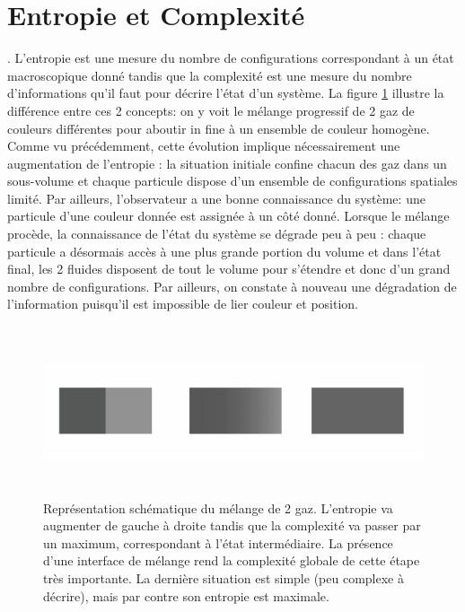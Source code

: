 \section{Entropie et Complexité}
. L'entropie est une mesure du nombre de configurations correspondant à un état macroscopique donné tandis que la complexité est une mesure du nombre d'informations qu'il faut pour décrire l'état d'un système. La figure \ref{f:melange} illustre la différence entre ces 2 concepts: on y voit le mélange progressif de 2 gaz de couleurs différentes pour aboutir in fine à un ensemble de couleur homogène. Comme vu précédemment, cette évolution implique nécessairement une augmentation de l'entropie : la situation initiale confine chacun des gaz dans un sous-volume et chaque particule dispose d'un ensemble de configurations spatiales limité. Par ailleurs, l'observateur a une bonne connaissance du système: une particule d'une couleur donnée est assignée à un côté donné. Lorsque le mélange procède, la connaissance de l'état du système se dégrade peu à peu : chaque particule a désormais accès à une plus grande portion du volume et dans l'état final, les 2 fluides disposent de tout le volume pour s'étendre et donc d'un grand nombre de configurations. Par ailleurs, on constate à nouveau une dégradation de l'information puisqu'il est impossible de lier couleur et position.
\begin{figure}[htbp]
	\centering
		\includegraphics[height=5cm]{figs/melange.png}
		\caption[Entropie \& Complexité]{Représentation schématique du mélange de 2 gaz. L'entropie va augmenter de gauche à droite tandis que la complexité va passer par un maximum, correspondant à l'état intermédiaire. La présence d'une interface de mélange rend la complexité globale de cette étape très importante. La dernière situation est simple (peu complexe à décrire), mais par contre son entropie est maximale.}
	\label{f:melange}
\end{figure}

